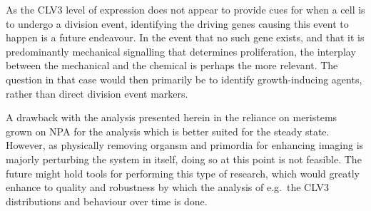As the CLV3 level of expression does not appear to provide cues for when a cell
is to undergo a division event, identifying the driving genes causing this
event to happen is a future endeavour. In the event that no such gene exists,
and that it is predominantly mechanical signalling that determines
proliferation, the interplay between the mechanical and the chemical is perhaps
the more relevant. The question in that case would then primarily be to identify
growth-inducing agents, rather than direct division event markers.

A drawback with the analysis presented herein in the reliance on meristems grown
on NPA for the analysis which is better suited for the steady state. However, as
physically removing organsm and primordia for enhancing imaging is majorly
perturbing the system in itself, doing so at this point is not feasible. The
future might hold tools for performing this type of research, which would
greatly enhance to quality and robustness by which the analysis of e.g.\ the
CLV3 distributions and behaviour over time is done.


